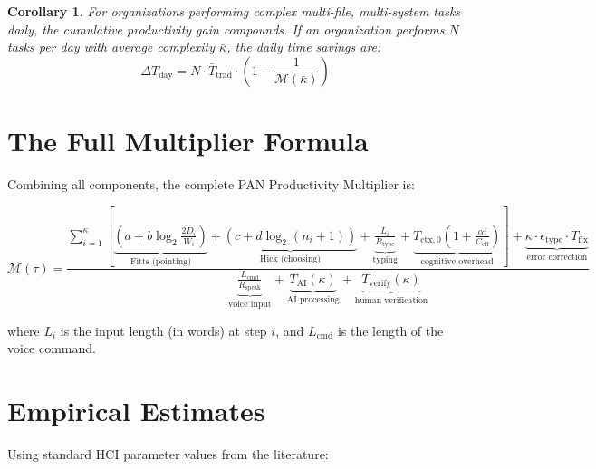 \documentclass[11pt, a4paper]{article}
\newtheorem{corollary}{Corollary}
\begin{document}
\begin{corollary}
For organizations performing complex multi-file, multi-system tasks daily, the
cumulative productivity gain compounds. If an organization performs $N$ tasks per
day with average complexity $\bar{\kappa}$, the daily time savings are:
\begin{equation}
  \Delta T_{\text{day}} = N \cdot \bar{T}_{\text{trad}} \cdot \left(1 - \frac{1}{\mathcal{M}(\bar{\kappa})}\right)
\end{equation}
\end{corollary}

\section{The Full Multiplier Formula}

Combining all components, the complete PAN Productivity Multiplier is:

\begin{equation}
\boxed{
  \mathcal{M}(\tau) = \frac{
    \displaystyle\sum_{i=1}^{\kappa}\left[
      \underbrace{\left(a + b\log_2\frac{2D_i}{W_i}\right)}_{\text{Fitts (pointing)}}
      + \underbrace{\left(c + d\log_2(n_i+1)\right)}_{\text{Hick (choosing)}}
      + \underbrace{\frac{L_i}{R_{\text{type}}}}_{\text{typing}}
      + \underbrace{T_{\text{ctx},0}\!\left(1 + \frac{\alpha i}{C_{\text{eff}}}\right)}_{\text{cognitive overhead}}
    \right]
    + \underbrace{\kappa \cdot \epsilon_{\text{type}} \cdot T_{\text{fix}}}_{\text{error correction}}
  }{
    \underbrace{\frac{L_{\text{cmd}}}{R_{\text{speak}}}}_{\text{voice input}}
    + \underbrace{T_{\text{AI}}(\kappa)}_{\text{AI processing}}
    + \underbrace{T_{\text{verify}}(\kappa)}_{\text{human verification}}
  }
}
\label{eq:full}
\end{equation}

where $L_i$ is the input length (in words) at step $i$, and $L_{\text{cmd}}$ is
the length of the voice command.

\section{Empirical Estimates}

Using standard HCI parameter values from the literature:
\end{document}

